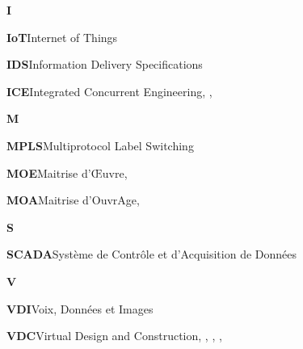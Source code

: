 \documentclass[a4paper,12pt]{article}
\begin{document}
\textbf{I}

\textbf{\hypertarget{gls-194}{IoT}}\hspace*{1em}Internet of Things\hspace*{.5em}\pageref{gls-16-use-1}

\textbf{\hypertarget{gls-189}{IDS}}\hspace*{1em}Information Delivery Specifications\hspace*{.5em}\pageref{gls-7-use-1}

\textbf{\hypertarget{gls-185}{ICE}}\hspace*{1em}Integrated Concurrent Engineering\hspace*{.5em}\pageref{gls-2-use-1}, \pageref{gls-2-use-2}, \pageref{gls-2-use-3}

\textbf{M}

\textbf{\hypertarget{gls-232}{MPLS}}\hspace*{1em}Multiprotocol Label Switching\hspace*{.5em}\pageref{gls-15-use-1}

\textbf{\hypertarget{gls-228}{MOE}}\hspace*{1em}Maitrise d'Œuvre\hspace*{.5em}\pageref{gls-9-use-1}, \pageref{gls-9-use-2}

\textbf{\hypertarget{gls-225}{MOA}}\hspace*{1em}Maitrise d’OuvrAge\hspace*{.5em}\pageref{gls-8-use-1}, \pageref{gls-8-use-2}

\textbf{S}

\textbf{\hypertarget{gls-305}{SCADA}}\hspace*{1em}Système de Contrôle et d'Acquisition de Données\hspace*{.5em}\pageref{gls-14-use-1}

\textbf{V}

\textbf{\hypertarget{gls-342}{VDI}}\hspace*{1em}Voix, Données et Images\hspace*{.5em}\pageref{gls-13-use-1}

\textbf{\hypertarget{gls-341}{VDC}}\hspace*{1em}Virtual Design and Construction\hspace*{.5em}\pageref{gls-3-use-1}, \pageref{gls-3-use-2}, \pageref{gls-3-use-3}, \pageref{gls-3-use-4}, \pageref{gls-3-use-5}
\end{document}
